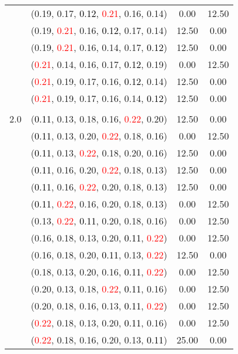 \documentclass[10pt,a4paper]{report}
\begin{document}
\begin{center}
\begin{longtable}{clcc}
			&(0.19, 0.17, \textcolor{black}{0.12}, \textcolor{red}{0.21}, 0.16, 0.14)&0.00&12.50\\
			&(0.19, \textcolor{red}{0.21}, 0.16, \textcolor{black}{0.12}, 0.17, 0.14)&12.50&0.00\\
			&(0.19, \textcolor{red}{0.21}, 0.16, 0.14, 0.17, \textcolor{black}{0.12})&12.50&0.00\\
			&(\textcolor{red}{0.21}, 0.14, 0.16, 0.17, \textcolor{black}{0.12}, 0.19)&0.00&12.50\\
			&(\textcolor{red}{0.21}, 0.19, 0.17, 0.16, \textcolor{black}{0.12}, 0.14)&12.50&0.00\\
			&(\textcolor{red}{0.21}, 0.19, 0.17, 0.16, 0.14, \textcolor{black}{0.12})&12.50&0.00\\
		&&&\\
		2.0			&(\textcolor{black}{0.11}, 0.13, 0.18, 0.16, \textcolor{red}{0.22}, 0.20)&12.50&0.00\\
			&(\textcolor{black}{0.11}, 0.13, 0.20, \textcolor{red}{0.22}, 0.18, 0.16)&0.00&12.50\\
			&(\textcolor{black}{0.11}, 0.13, \textcolor{red}{0.22}, 0.18, 0.20, 0.16)&12.50&0.00\\
			&(\textcolor{black}{0.11}, 0.16, 0.20, \textcolor{red}{0.22}, 0.18, 0.13)&12.50&0.00\\
			&(\textcolor{black}{0.11}, 0.16, \textcolor{red}{0.22}, 0.20, 0.18, 0.13)&12.50&0.00\\
			&(\textcolor{black}{0.11}, \textcolor{red}{0.22}, 0.16, 0.20, 0.18, 0.13)&0.00&12.50\\
			&(0.13, \textcolor{red}{0.22}, \textcolor{black}{0.11}, 0.20, 0.18, 0.16)&0.00&12.50\\
			&(0.16, 0.18, 0.13, 0.20, \textcolor{black}{0.11}, \textcolor{red}{0.22})&0.00&12.50\\
			&(0.16, 0.18, 0.20, \textcolor{black}{0.11}, 0.13, \textcolor{red}{0.22})&12.50&0.00\\
			&(0.18, 0.13, 0.20, 0.16, \textcolor{black}{0.11}, \textcolor{red}{0.22})&0.00&12.50\\
			&(0.20, 0.13, 0.18, \textcolor{red}{0.22}, \textcolor{black}{0.11}, 0.16)&0.00&12.50\\
			&(0.20, 0.18, 0.16, 0.13, \textcolor{black}{0.11}, \textcolor{red}{0.22})&0.00&12.50\\
			&(\textcolor{red}{0.22}, 0.18, 0.13, 0.20, \textcolor{black}{0.11}, 0.16)&0.00&12.50\\
			&(\textcolor{red}{0.22}, 0.18, 0.16, 0.20, 0.13, \textcolor{black}{0.11})&25.00&0.00\\

\end{longtable}
\end{center}
\end{document}
